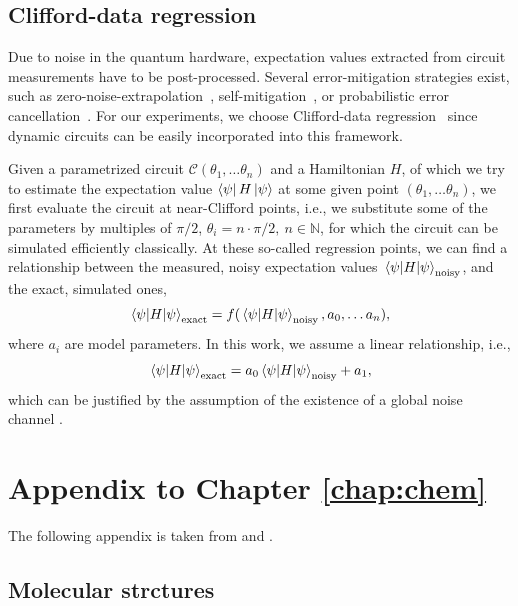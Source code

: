 \documentclass[../main.tex]{subfiles}
\begin{document}
\subsection{Clifford-data regression}\label{appendix:cdr}
Due to noise in the quantum hardware, expectation values extracted from circuit measurements have to be post-processed.
Several error-mitigation strategies exist, such as zero-noise-extrapolation~\cite{PhysRevLett.119.180509}, self-mitigation~\cite{ARahman:2022tkr}, or probabilistic error cancellation~\cite{van2023probabilistic,gupta2023probabilistic}.
For our experiments, we choose Clifford-data regression~\cite{Czarnik2021errormitigation} since dynamic circuits can be easily incorporated into this framework.

Given a parametrized circuit $\mathcal{C}(\theta_1,\dotsc \theta_n)$ and a Hamiltonian $H$, of which we try to estimate the expectation value $\bra{\psi}H\ket{\psi}$ at some given point $(\theta_1,\dotsc \theta_n)$, we first evaluate the circuit at near-Clifford points, i.e., we substitute some of the parameters by multiples of $\pi/2$, $\theta_i = n\cdot\pi/2,\ n\in \mathbb{N}$, for which the circuit can be simulated efficiently classically.
At these so-called regression points, we can find a relationship between the measured, noisy expectation values $\expval{H}{\psi}_\mathrm{noisy}$, and the exact, simulated ones,
\begin{equation}
    \expval{H}{\psi}_\mathrm{exact}=f(\expval{H}{\psi}_\mathrm{ noisy},a_0,\dotsc a_n),
\end{equation}
where $a_i$ are model parameters.
In this work, we assume a linear relationship, i.e.,
\begin{equation}
    \expval{H}{\psi}_\mathrm{exact}=a_0 \expval{H}{\psi}_\mathrm{noisy}+a_1,
\end{equation}
which can be justified by the assumption of the existence of a global noise channel \cite{Czarnik2021errormitigation}.


\section{Appendix to Chapter \ref{chap:chem}}

The following appendix is taken from \cite{amsler2023classical} and \cite{kiser2024classical}.

\subsection{Molecular strctures}
\end{document}
